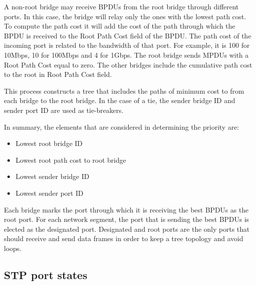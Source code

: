 A non-root bridge may receive BPDUs from the root bridge through different ports.
In this case, the bridge will relay only the ones with the lowest path cost.
To compute the path cost it will add the cost of the path through which the BPDU is received to the Root Path Cost field of the BPDU.
The path cost of the incoming port is related to the bandwidth of that port.
For example, it is 100 for 10Mbps, 10 for 100Mbps and 4 for 1Gbps.
The root bridge sends MPDUs with a Root Path Cost equal to zero.
The other bridges include the cumulative path cost to the root in Root Path Cost field.

This process constructs a tree that includes the paths of minimum cost to from each bridge to the root bridge.
In the case of a tie, the sender bridge ID and sender port ID are used as tie-breakers.

In summary, the elements that are considered in determining the priority are:
\begin{itemize}
\item Lowest root bridge ID
\item Lowest root path cost to root bridge
\item Lowest sender bridge ID
\item Lowest sender port ID
\end{itemize}

Each bridge marks the port through which it is receiving the best BPDUs as the root port.
For each network segment, the port that is sending the best BPDUs is elected as the designated port.
Designated and root ports are the only ports that should receive and send data frames in order to keep a tree topology and avoid loops.

\subsection{STP port states}

